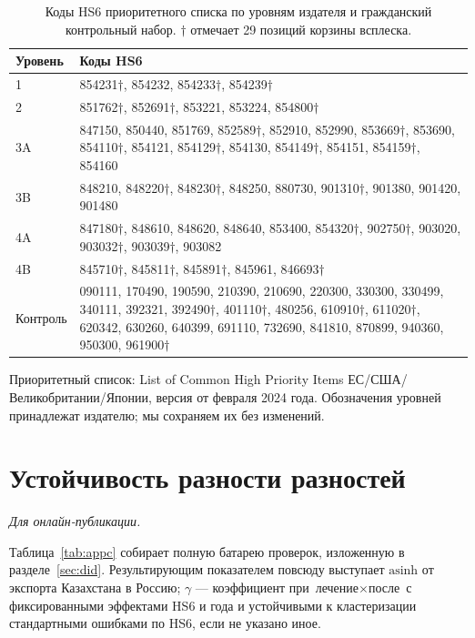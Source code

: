 \documentclass[12pt]{article}
\begin{document}
\begin{table}[htbp]
\centering
\caption{Коды HS6 приоритетного списка по уровням издателя и гражданский контрольный
набор. $\dagger$ отмечает 29 позиций корзины всплеска.}
\label{tab:appb}
\footnotesize
\begin{tabular}{@{}p{1.6cm}p{12.4cm}@{}}
\toprule
Уровень & Коды HS6 \\
\midrule
1 & 854231$\dagger$, 854232, 854233$\dagger$, 854239$\dagger$ \\
2 & 851762$\dagger$, 852691$\dagger$, 853221, 853224, 854800$\dagger$ \\
3A & 847150, 850440, 851769, 852589$\dagger$, 852910, 852990, 853669$\dagger$, 853690, 854110$\dagger$, 854121, 854129$\dagger$, 854130, 854149$\dagger$, 854151, 854159$\dagger$, 854160 \\
3B & 848210, 848220$\dagger$, 848230$\dagger$, 848250, 880730, 901310$\dagger$, 901380, 901420, 901480 \\
4A & 847180$\dagger$, 848610, 848620, 848640, 853400, 854320$\dagger$, 902750$\dagger$, 903020, 903032$\dagger$, 903039$\dagger$, 903082 \\
4B & 845710$\dagger$, 845811$\dagger$, 845891$\dagger$, 845961, 846693$\dagger$ \\
\midrule
Контроль & 090111, 170490, 190590, 210390, 210690, 220300, 330300, 330499, 340111, 392321, 392490$\dagger$, 401110$\dagger$, 480256, 610910$\dagger$, 611020$\dagger$, 620342, 630260, 640399, 691110, 732690, 841810, 870899, 940360, 950300, 961900$\dagger$ \\
\bottomrule
\end{tabular}

\vspace{2pt}
\footnotesize Приоритетный список: List of Common High Priority Items ЕС/США/Великобритании/Японии,
версия от февраля 2024 года. Обозначения уровней принадлежат издателю; мы сохраняем их без
изменений.
\end{table}

\section{Устойчивость разности разностей}\label{app:did}
\emph{Для онлайн-публикации.}

\medskip
Таблица~\ref{tab:appc} собирает полную батарею проверок, изложенную в
разделе~\ref{sec:did}. Результирующим показателем повсюду выступает $\text{asinh}$ от
экспорта Казахстана в Россию; $\gamma$ — коэффициент при
$\text{лечение}\times\text{после}$ с фиксированными эффектами HS6 и года и устойчивыми к
кластеризации стандартными ошибками по HS6, если не указано иное.
\end{document}
